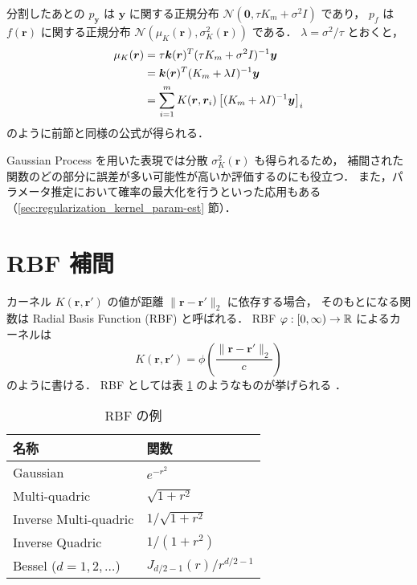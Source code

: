 分割したあとの
$p_{\bm{y}}$ は $\bm{y}$ に関する正規分布 $\mathcal{N}(\bm{0}, \tau K_m + \sigma^2 I)$ であり，
$p_f$ は $f(\bm{r})$ に関する正規分布 $\mathcal{N}(\mu_K(\bm{r}), \sigma_K^2(\bm{r}))$ である．
$\lambda = \sigma^2 / \tau$ とおくと，
\begin{align}
    \mu_K(\bm{r})
     & = \tau \bm{k}(\bm{r})^T (\tau K_m + \sigma^2 I)^{-1} \bm{y}
    \notag                                                                               \\
     & = \bm{k}(\bm{r})^T (K_m + \lambda I)^{-1} \bm{y}
    \notag                                                                               \\
     & = \sum_{i = 1}^m K(\bm{r}, \bm{r}_i) \left[(K_m + \lambda I)^{-1} \bm{y}\right]_i
\end{align}
のように前節と同様の公式が得られる．

Gaussian Process を用いた表現では分散 $\sigma_K^2(\bm{r})$ も得られるため，
補間された関数のどの部分に誤差が多い可能性が高いか評価するのにも役立つ．
また，パラメータ推定において確率の最大化を行うといった応用もある
（\ref{sec:regularization_kernel_param-est} 節）．

\section{RBF 補間}\label{sec:interp_kernel_rbf}

カーネル $K(\bm{r}, \bm{r}')$ の値が距離 $\|\bm{r} - \bm{r}'\|_2$ に依存する場合，
そのもとになる関数は Radial Basis Function (RBF) と呼ばれる．
RBF $\varphi : [0, \infty) \to \mathbb{R}$ によるカーネルは
\begin{equation}
    K(\bm{r}, \bm{r}') = \phi\left(\frac{\|\bm{r} - \bm{r}'\|_2}{c}\right)
    \label{eq:regularization_kernel_kernel-of-rbf}
\end{equation}
のように書ける．
RBF としては表
\ref{table:interp_kernel_example-rbfs}
のようなものが挙げられる
\cite{Brochu2010,Fornberg2015}．

\begin{table}[bp]
    \caption{RBF の例 \cite{Brochu2010,Fornberg2015}}
    \label{table:interp_kernel_example-rbfs}
    \centering
    \begin{tabular}{ll}
        名称                      & 関数                         \\
        \hline
        Gaussian                & $e^{-r^2}$                 \\
        Multi-quadric           & $\sqrt{1 + r^2}$           \\
        Inverse Multi-quadric   & $1/\sqrt{1 + r^2}$         \\
        Inverse Quadric         & $1 / (1 + r^2)$            \\
        Bessel ($d=1,2,\ldots$) & $J_{d/2-1}(r) / r^{d/2-1}$
    \end{tabular}
\end{table}

